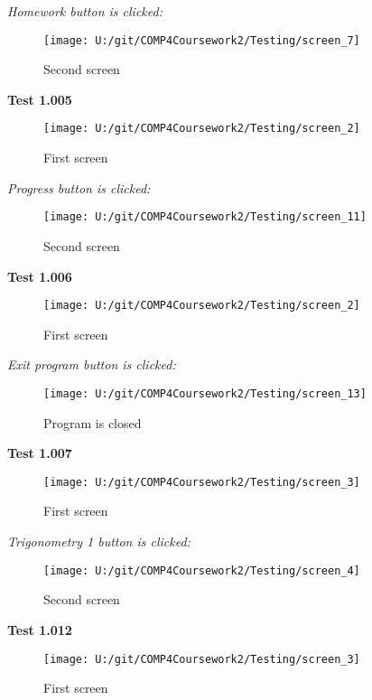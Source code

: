\textit{Homework button is clicked: }

\begin{figure}[H]
    \label{fig: Second Screen}\caption{Second screen}
    \texttt{[image: U:/git/COMP4Coursework2/Testing/screen\_7]}
\end{figure}

\textbf{Test 1.005}

\begin{figure}[H]
    \label{fig: First Screen}\caption{First screen}
    \texttt{[image: U:/git/COMP4Coursework2/Testing/screen\_2]}
\end{figure}

\textit{Progress button is clicked: }

\begin{figure}[H]
    \label{fig: Second Screen}\caption{Second screen}
    \texttt{[image: U:/git/COMP4Coursework2/Testing/screen\_11]}
\end{figure}

\textbf{Test 1.006}

\begin{figure}[H]
    \label{fig: First Screen}\caption{First screen}
    \texttt{[image: U:/git/COMP4Coursework2/Testing/screen\_2]}
\end{figure}

\textit{Exit program button is clicked: }

\begin{figure}[H]
    \label{fig: Second Screen}\caption{Program is closed}
    \texttt{[image: U:/git/COMP4Coursework2/Testing/screen\_13]}
\end{figure}

\textbf{Test 1.007}

\begin{figure}[H]
    \label{fig: First Screen}\caption{First screen}
    \texttt{[image: U:/git/COMP4Coursework2/Testing/screen\_3]}
\end{figure}

\textit{Trigonometry 1 button is clicked: }

\begin{figure}[H]
    \label{fig: Second Screen}\caption{Second screen}
    \texttt{[image: U:/git/COMP4Coursework2/Testing/screen\_4]}
\end{figure}

\textbf{Test 1.012}

\begin{figure}[H]
    \label{fig: First Screen}\caption{First screen}
    \texttt{[image: U:/git/COMP4Coursework2/Testing/screen\_3]}
\end{figure}

